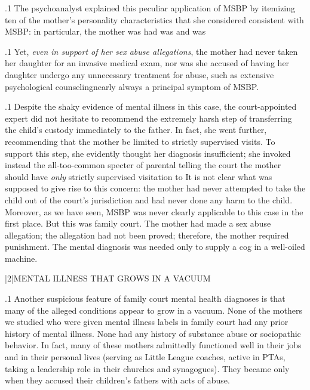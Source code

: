 \documentclass[11pt, twoside]{article}
\begin{document}
{\p.1{%
The psychoanalyst explained this peculiar application of MSBP by
itemizing ten of the mother’s personality characteristics that she considered consistent with MSBP: in particular, the mother was  had  was 
and was 
}%

\p.1{%
Yet, \textit{even in support of her sex abuse allegations}, the mother had never
taken her daughter for an invasive medical exam, nor was she accused
of having her daughter undergo any unnecessary treatment for abuse,
such as extensive psychological counseling\mdash{}nearly always a principal
symptom of MSBP.
}%

\p.1{%
Despite the shaky evidence of mental illness in this case,
the court-appointed expert did not hesitate to recommend the extremely harsh
step of transferring the child’s custody immediately to the father. In fact,
she went further, recommending that the mother be limited to strictly
supervised visits. To support this step, she evidently thought her diagnosis insufficient; she invoked instead the all-too-common specter of
parental  telling the court the mother should have \textit{only} strictly
supervised visitation to  It is
not clear what was supposed to give rise to this concern: the mother had
never attempted to take the child out of the court’s jurisdiction and had
never done any harm to the child. Moreover, as we have seen, MSBP was
never clearly applicable to this case in the first place.
But this was family court. The mother had made a sex abuse allegation; the allegation had not been proved; therefore, the mother required
punishment. The mental diagnosis was needed only to supply a cog in a
well-oiled machine.
}%


\s|2|{MENTAL ILLNESS THAT GROWS IN A VACUUM}

\p.1{%
\noindent{}Another suspicious feature of family court mental health diagnoses
is that many of the alleged conditions appear to grow in a vacuum.
None of the mothers we studied who were given mental illness labels
in family court had any prior history of mental illness. None had any
history of substance abuse or sociopathic behavior. In fact, many of
these mothers admittedly functioned well in their jobs and in their personal lives (serving as Little League coaches, active in PTAs, taking a
leadership role in their churches and synagogues). They became  only when they accused their children’s fathers with acts of
abuse.
}%

}
\end{document}
